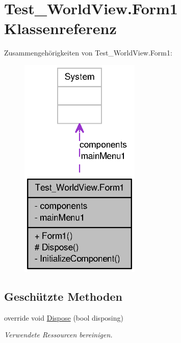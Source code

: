 \hypertarget{class_test___world_view_1_1_form1}{
\section{Test\_\-WorldView.Form1 Klassenreferenz}
\label{class_test___world_view_1_1_form1}
}


Zusammengehörigkeiten von Test\_\-WorldView.Form1:\nopagebreak
\begin{figure}[H]
\begin{center}
\leavevmode
\includegraphics[width=162pt]{class_test___world_view_1_1_form1__coll__graph}
\end{center}
\end{figure}
\subsection*{Geschützte Methoden}
\begin{DoxyCompactItemize}
\item 
override void \hyperlink{class_test___world_view_1_1_form1_aeb423a166a4e2a2273b5b825f12ecc2d}{Dispose} (bool disposing)
\begin{DoxyCompactList}\small\item\em Verwendete Ressourcen bereinigen. \item\end{DoxyCompactList}\end{DoxyCompactItemize}


